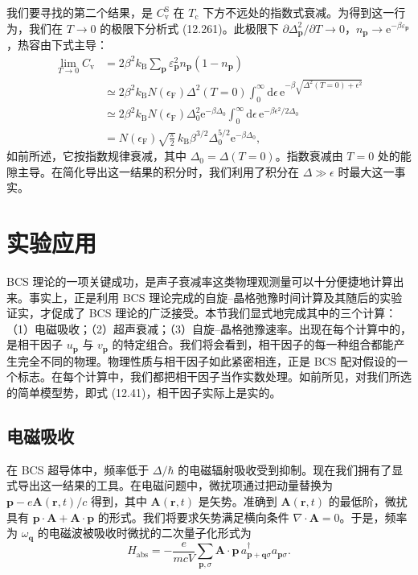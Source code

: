 我们要寻找的第二个结果，是 $C_{\mathrm{v}}^{\mathrm{S}}$ 在 $T_{\mathrm{c}}$ 下方不远处的指数式衰减。为得到这一行为，我们在 $T\to 0$ 的极限下分析式 (12.261)。此极限下 $\partial\Delta_{\mathbf{p}}^{2}/\partial T\to 0$，$n_{\mathbf{p}}\to\mathrm{e}^{-\beta\varepsilon_{\mathbf{p}}}$，热容由下式主导：
\begin{align*}
\lim_{T\to 0}C_{\mathrm{v}}&=2\beta^{2}k_{\mathrm{B}}\sum_{\mathbf{p}}\varepsilon_{\mathbf{p}}^{2}n_{\mathbf{p}}\left(1-n_{\mathbf{p}}\right)\\
&\simeq 2\beta^{2}k_{\mathrm{B}}N(\epsilon_{\mathrm{F}})\Delta^{2}(T=0)\int_{0}^{\infty}\mathrm{d}\epsilon\,\mathrm{e}^{-\beta\sqrt{\Delta^{2}(T=0)+\epsilon^{2}}}\\
&\simeq 2\beta^{2}k_{\mathrm{B}}N(\epsilon_{\mathrm{F}})\Delta_{0}^{2}\mathrm{e}^{-\beta\Delta_{0}}\int_{0}^{\infty}\mathrm{d}\epsilon\,\mathrm{e}^{-\beta\epsilon^{2}/2\Delta_{0}}\\
&=N(\epsilon_{\mathrm{F}})\sqrt{\frac{\pi}{2}}\,k_{\mathrm{B}}\beta^{3/2}\Delta_{0}^{5/2}\mathrm{e}^{-\beta\Delta_{0}},\tag{12.266}
\end{align*}
如前所述，它按指数规律衰减，其中 $\Delta_{0}=\Delta(T=0)$。指数衰减由 $T=0$ 处的能隙主导。在简化导出这一结果的积分时，我们利用了积分在 $\Delta\gg\epsilon$ 时最大这一事实。

\section{实验应用}

BCS 理论的一项关键成功，是声子衰减率这类物理观测量可以十分便捷地计算出来。事实上，正是利用 BCS 理论完成的自旋–晶格弛豫时间计算及其随后的实验证实，才促成了 BCS 理论的广泛接受。本节我们显式地完成其中的三个计算：（1）电磁吸收；（2）超声衰减；（3）自旋–晶格弛豫速率。出现在每个计算中的，是相干因子 $u_{\mathbf{p}}$ 与 $v_{\mathbf{p}}$ 的特定组合。我们将会看到，相干因子的每一种组合都能产生完全不同的物理。物理性质与相干因子如此紧密相连，正是 BCS 配对假设的一个标志。在每个计算中，我们都把相干因子当作实数处理。如前所见，对我们所选的简单模型势，即式 (12.41)，相干因子实际上是实的。

\subsection{电磁吸收}

在 BCS 超导体中，频率低于 $\Delta/\hbar$ 的电磁辐射吸收受到抑制。现在我们拥有了显式导出这一结果的工具。在电磁问题中，微扰项通过把动量替换为 $\mathbf{p}-e\mathbf{A}(\mathbf{r},t)/c$ 得到，其中 $\mathbf{A}(\mathbf{r},t)$ 是矢势。准确到 $\mathbf{A}(\mathbf{r},t)$ 的最低阶，微扰具有 $\mathbf{p}\cdot\mathbf{A}+\mathbf{A}\cdot\mathbf{p}$ 的形式。我们将要求矢势满足横向条件 $\nabla\cdot\mathbf{A}=0$。于是，频率为 $\omega_{\mathbf{q}}$ 的电磁波被吸收时微扰的二次量子化形式为
\begin{equation*}
H_{\mathrm{abs}}=-\frac{e}{mcV}\sum_{\mathbf{p},\sigma}\mathbf{A}\cdot\mathbf{p}\,a_{\mathbf{p}+\mathbf{q}\sigma}^{\dagger}a_{\mathbf{p}\sigma}.\tag{12.267}
\end{equation*}


